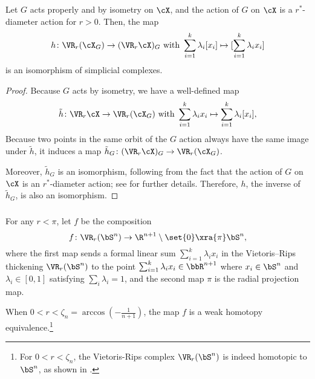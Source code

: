 \medskip\lemma
Let $G$ acts properly and by isometry on $\cX$, and the action of $G$ on $\cX$ is a $r^*$-diameter action for $r>0$. Then, the map
\[
h \colon \VR_r(\cX_G) \to (\VR_r\cX)_G
\text{ with }
\sum_{i=1}^k \lambda_i [x_i] \mapsto [\sum_{i=1}^k \lambda_i x_i]
\]
is an isomorphism of simplicial complexes.

\begin{proof}
	Because $G$ acts by isometry, we have a well-defined map
	\[
	\tilde{h} \colon \VR_r\cX \to \VR_r(\cX_G)
	\text{ with }
	\sum_{i=1}^k \lambda_i x_i \mapsto \sum_{i=1}^k \lambda_i [x_i],
	\]
	Because two points in the same orbit of the $G$ action always have the same image under $\tilde{h}$, it induces a map $\tilde{h}_G \colon (\VR_r\cX)_G \to \VR_r(\cX_G)$.

	Moreover, $\tilde{h}_G$ is an isomorphism, following from the fact that the action of $G$ on $\cX$ is an $r^*$-diameter action; see \cite[Proposition 3.5]{adams2022metric} for further details.
	Therefore, $h$, the inverse of $\tilde{h}_G$, is also an isomorphism.
\end{proof}

\subsubsection{}
\label{subsub:f}

For any $r<\pi$, let $f$ be the composition
\[
f \colon \VR_r(\bS^n) \to \R^{n+1} \setminus \set{0} \xra{\pi} \bS^n,
\]
where the first map sends a formal linear sum $\sum_{i=1}^k \lambda_i x_i$ in the Vietoris--Rips thickening $\VR_r(\bS^n)$ to the point $\sum_{i=1}^k \lambda_i x_i \in \bbR^{n+1}$ where $x_i \in \bS^n$ and $\lambda_i \in [0,1]$ satisfying $\sum_i\lambda_i=1$, and the second map $\pi$ is the radial projection map.

\medskip\lemma
When $0<r<\zeta_n=\arccos{(-\tfrac{1}{n+1})}$, the map $f$ is a weak homotopy equivalence.\footnote{For $0<r<\zeta_n$, the Vietoris-Rips complex $\VR_r(\bS^n)$ is indeed homotopic to $\bS^n$, as shown in \cite[Theorem 7.1]{lim2020vietoris}.}

